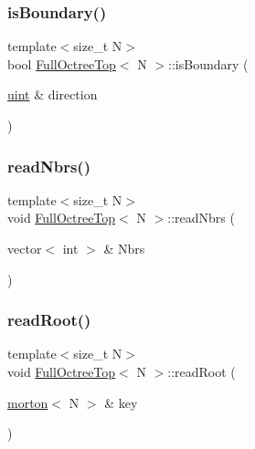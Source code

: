 \mbox{\label{classFullOctreeTop_a2bf2086d8ace9c6db669a85ed5e8ae19}} 
\subsubsection{\texorpdfstring{is\+Boundary()}{isBoundary()}}
{\footnotesize\ttfamily template$<$size\+\_\+t N$>$ \\
bool \mbox{\hyperlink{classFullOctreeTop}{Full\+Octree\+Top}}$<$ N $>$\+::is\+Boundary (\begin{DoxyParamCaption}\item[{\mbox{\hyperlink{definitions_8h_a69aa29b598b851b0640aa225a9e5d61d}{uint}} \&}]{direction }\end{DoxyParamCaption})}

\mbox{\label{classFullOctreeTop_a6aef4523a1aed2a6e5dd3f96645437a5}} 
\subsubsection{\texorpdfstring{read\+Nbrs()}{readNbrs()}}
{\footnotesize\ttfamily template$<$size\+\_\+t N$>$ \\
void \mbox{\hyperlink{classFullOctreeTop}{Full\+Octree\+Top}}$<$ N $>$\+::read\+Nbrs (\begin{DoxyParamCaption}\item[{vector$<$ int $>$ \&}]{Nbrs }\end{DoxyParamCaption})}

\mbox{\label{classFullOctreeTop_a85946366894a248148512cb045798cc5}} 
\subsubsection{\texorpdfstring{read\+Root()}{readRoot()}}
{\footnotesize\ttfamily template$<$size\+\_\+t N$>$ \\
void \mbox{\hyperlink{classFullOctreeTop}{Full\+Octree\+Top}}$<$ N $>$\+::read\+Root (\begin{DoxyParamCaption}\item[{\mbox{\hyperlink{definitions_8h_af8682350bd8bb38ee9023f7a0a310add}{morton}}$<$ N $>$ \&}]{key }\end{DoxyParamCaption})}



